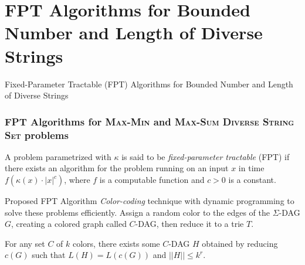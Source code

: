 \documentclass{beamer}
\begin{document}

\section{FPT Algorithms for Bounded Number and Length of Diverse Strings}
\begin{frame}
    \begin{center}
        \huge{Fixed-Parameter Tractable (FPT) Algorithms for Bounded Number and Length of Diverse Strings}
    \end{center}
\end{frame}

\begin{frame}
    \frametitle{FPT Algorithms for \textsc{Max-Min} and \textsc{Max-Sum Diverse String Set} problems}
    \begin{definition}
        A problem parametrized with $\kappa$ is said to be \emph{fixed-parameter tractable} (FPT) if there exists an algorithm for the problem running on an input $x$ in time $f(\kappa (x) \cdot |x|^c)$, where $f$ is a computable function and $c > 0$ is a constant.
    \end{definition}
    \begin{block}{Proposed FPT Algorithm}
        \textit{Color-coding} technique with dynamic programming to solve these problems efficiently. Assign a random color to the edges of the $\Sigma$-DAG $G$, creating a colored graph called $C$-DAG, then reduce it to a trie $T$.
    \end{block}
    \begin{theorem}
        For any set $C$ of $k$ colors, there exists some $C$-DAG $H$ obtained by reducing $c(G)$ such that $L(H) = L(c(G))$ and $||H|| \le k^r$.
    \end{theorem}

\end{frame}
\end{document}
